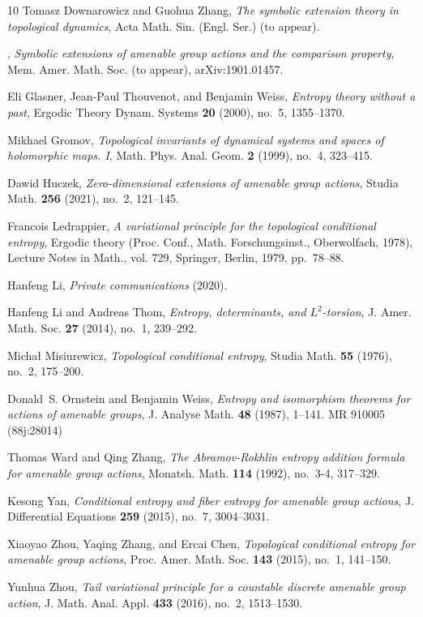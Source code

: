 \documentclass[12pt]{amsart}
\theoremstyle{definition}
\numberwithin{equation}{section}
\begin{document}
\begin{thebibliography}{10}
Tomasz Downarowicz and Guohua Zhang, \emph{The symbolic extension theory in
	topological dynamics}, Acta Math. Sin. (Engl. Ser.) (to appear).

\bysame, \emph{Symbolic extensions of amenable group actions and the comparison
	property}, Mem. Amer. Math. Soc. (to appear), arXiv:1901.01457.

Eli Glasner, Jean-Paul Thouvenot, and Benjamin Weiss, \emph{Entropy theory
	without a past}, Ergodic Theory Dynam. Systems \textbf{20} (2000), no.~5,
1355--1370. 

Mikhael Gromov, \emph{Topological invariants of dynamical systems and spaces of
	holomorphic maps. {I}}, Math. Phys. Anal. Geom. \textbf{2} (1999), no.~4,
323--415. 

Dawid Huczek, \emph{Zero-dimensional extensions of amenable group actions},
Studia Math. \textbf{256} (2021), no.~2, 121--145. 

Francois Ledrappier, \emph{A variational principle for the topological
	conditional entropy}, Ergodic theory ({P}roc. {C}onf., {M}ath.
{F}orschungsinst., {O}berwolfach, 1978), Lecture Notes in Math., vol. 729,
Springer, Berlin, 1979, pp.~78--88. 

Hanfeng Li, \emph{Private communications} (2020).

Hanfeng Li and Andreas Thom, \emph{Entropy, determinants, and {$L^2$}-torsion},
J. Amer. Math. Soc. \textbf{27} (2014), no.~1, 239--292.

Micha{\l} Misiurewicz, \emph{Topological conditional entropy}, Studia Math.
\textbf{55} (1976), no.~2, 175--200. 

Donald~S. Ornstein and Benjamin Weiss, \emph{Entropy and isomorphism theorems for actions of amenable groups}, J. Analyse Math. \textbf{48} (1987), 1--141. MR 910005 (88j:28014)

Thomas Ward and Qing Zhang, \emph{The {A}bramov-{R}okhlin entropy addition
	formula for amenable group actions}, Monatsh. Math. \textbf{114} (1992),
no.~3-4, 317--329. 

Kesong Yan, \emph{Conditional entropy and fiber entropy for amenable group
	actions}, J. Differential Equations \textbf{259} (2015), no.~7, 3004--3031.

Xiaoyao Zhou, Yaqing Zhang, and Ercai Chen, \emph{Topological conditional
	entropy for amenable group actions}, Proc. Amer. Math. Soc. \textbf{143}
(2015), no.~1, 141--150. 

Yunhua Zhou, \emph{Tail variational principle for a countable discrete amenable
	group action}, J. Math. Anal. Appl. \textbf{433} (2016), no.~2, 1513--1530.


\end{thebibliography}


\printindex
\end{document}
